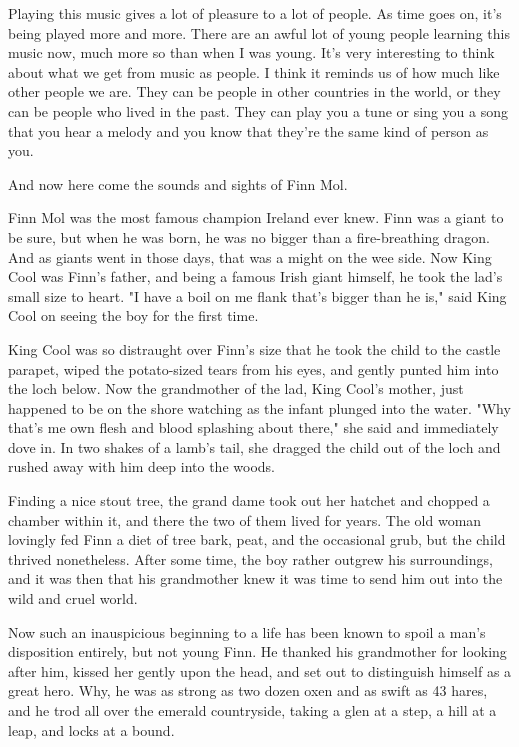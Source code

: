 Playing this music gives a lot of pleasure to a lot of people. As time goes on, it's being played more and more. There are an awful lot of young people learning this music now, much more so than when I was young. It's very interesting to think about what we get from music as people. I think it reminds us of how much like other people we are. They can be people in other countries in the world, or they can be people who lived in the past. They can play you a tune or sing you a song that you hear a melody and you know that they're the same kind of person as you.

And now here come the sounds and sights of Finn Mol.

Finn Mol was the most famous champion Ireland ever knew. Finn was a giant to be sure, but when he was born, he was no bigger than a fire-breathing dragon. And as giants went in those days, that was a might on the wee side. Now King Cool was Finn's father, and being a famous Irish giant himself, he took the lad's small size to heart. "I have a boil on me flank that's bigger than he is," said King Cool on seeing the boy for the first time.

King Cool was so distraught over Finn's size that he took the child to the castle parapet, wiped the potato-sized tears from his eyes, and gently punted him into the loch below. Now the grandmother of the lad, King Cool's mother, just happened to be on the shore watching as the infant plunged into the water. "Why that's me own flesh and blood splashing about there," she said and immediately dove in. In two shakes of a lamb's tail, she dragged the child out of the loch and rushed away with him deep into the woods.

Finding a nice stout tree, the grand dame took out her hatchet and chopped a chamber within it, and there the two of them lived for years. The old woman lovingly fed Finn a diet of tree bark, peat, and the occasional grub, but the child thrived nonetheless. After some time, the boy rather outgrew his surroundings, and it was then that his grandmother knew it was time to send him out into the wild and cruel world.

Now such an inauspicious beginning to a life has been known to spoil a man's disposition entirely, but not young Finn. He thanked his grandmother for looking after him, kissed her gently upon the head, and set out to distinguish himself as a great hero. Why, he was as strong as two dozen oxen and as swift as 43 hares, and he trod all over the emerald countryside, taking a glen at a step, a hill at a leap, and locks at a bound.


